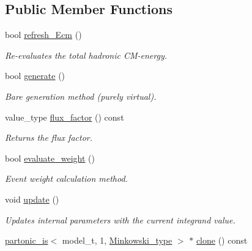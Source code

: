 \subsection*{Public Member Functions}
\begin{DoxyCompactItemize}
\item 
\hypertarget{a00413_a847328f98715570e0947cd62f67e29e1}{}bool \hyperlink{a00413_a847328f98715570e0947cd62f67e29e1}{refresh\+\_\+\+Ecm} ()\label{a00413_a847328f98715570e0947cd62f67e29e1}

\begin{DoxyCompactList}\small\item\em Re-\/evaluates the total hadronic C\+M-\/energy. \end{DoxyCompactList}\item 
bool \hyperlink{a00413_a0dc3e17f5e62711bee89a872b66a6a73}{generate} ()
\begin{DoxyCompactList}\small\item\em \textquotesingle{}Bare generation\textquotesingle{} method (purely virtual). \end{DoxyCompactList}\item 
\hypertarget{a00413_a985936d80fc0f5870b51818bd31584fd}{}value\+\_\+type \hyperlink{a00413_a985936d80fc0f5870b51818bd31584fd}{flux\+\_\+factor} () const \label{a00413_a985936d80fc0f5870b51818bd31584fd}

\begin{DoxyCompactList}\small\item\em Returns the flux factor. \end{DoxyCompactList}\item 
\hypertarget{a00413_ad8ad355c045c1db4994d402bc55a564a}{}bool \hyperlink{a00413_ad8ad355c045c1db4994d402bc55a564a}{evaluate\+\_\+weight} ()\label{a00413_ad8ad355c045c1db4994d402bc55a564a}

\begin{DoxyCompactList}\small\item\em Event weight calculation method. \end{DoxyCompactList}\item 
\hypertarget{a00413_ac1546a64df424377af90150d8a53b3d1}{}void \hyperlink{a00413_ac1546a64df424377af90150d8a53b3d1}{update} ()\label{a00413_ac1546a64df424377af90150d8a53b3d1}

\begin{DoxyCompactList}\small\item\em Updates internal parameters with the current integrand value. \end{DoxyCompactList}\item 
\hypertarget{a00413_ab22e62e68f342248e0423f207cae88cf}{}\hyperlink{a00412}{partonic\+\_\+is}$<$ model\+\_\+t, 1, \hyperlink{a00371}{Minkowski\+\_\+type} $>$ $\ast$ \hyperlink{a00413_ab22e62e68f342248e0423f207cae88cf}{clone} () const \label{a00413_ab22e62e68f342248e0423f207cae88cf}


\end{DoxyCompactItemize}
